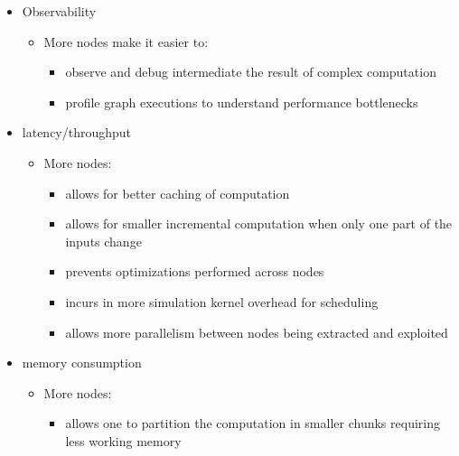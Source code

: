 \documentclass[11pt, reqno]{amsart}
\theoremstyle{definition}
\theoremstyle{remark}
\begin{document}
  \begin{itemize}
    \item Observability

      \begin{itemize}
        \item More nodes make it easier to:

          \begin{itemize}
            \item observe and debug intermediate the result of complex computation

            \item profile graph executions to understand performance bottlenecks
          \end{itemize}
      \end{itemize}

    \item latency/throughput

      \begin{itemize}
        \item More nodes:

          \begin{itemize}
            \item allows for better caching of computation

            \item allows for smaller incremental computation when only one part of
              the inputs change

            \item prevents optimizations performed across nodes

            \item incurs in more simulation kernel overhead for scheduling

            \item allows more parallelism between nodes being extracted and exploited
          \end{itemize}
      \end{itemize}

    \item memory consumption

      \begin{itemize}
        \item More nodes:

          \begin{itemize}
            \item allows one to partition the computation in smaller chunks requiring
              less working memory
          \end{itemize}
      \end{itemize}
  \end{itemize}
\end{document}
